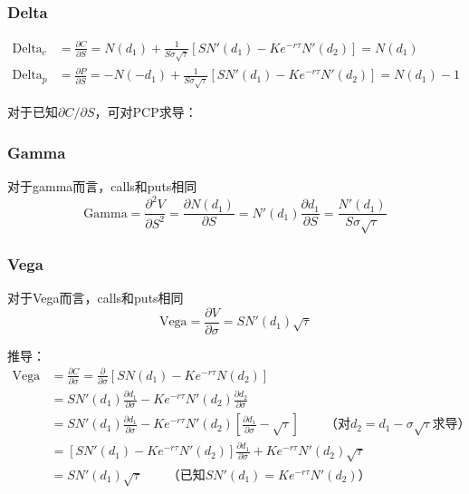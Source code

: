 \documentclass[11pt]{article}
\begin{document}
\subsubsection{Delta}

\noindent
\begin{align*}
    \text{Delta}_c &= \frac{\partial C}{\partial S}
    = N(d_1) + \frac{1}{S\sigma\sqrt{\tau}} \left[ SN'(d_1)-Ke^{-r\tau}N'(d_2) \right] = N(d_1) \\
    \text{Delta}_p &= \frac{\partial P}{\partial S}
    = -N(-d_1) + \frac{1}{S\sigma\sqrt{\tau}} \left[ SN'(d_1)-Ke^{-r\tau}N'(d_2) \right] = N(d_1)-1
\end{align*}

对于已知$\partial C/\partial S$，可对PCP求导：

\subsubsection{Gamma}

对于gamma而言，calls和puts相同
\begin{equation*}
    \text{Gamma} = \frac{\partial^2 V}{\partial S^2} = \frac{\partial N(d_1)}{\partial S} = N'(d_1)\frac{\partial d_1}{\partial S} = \frac{N'(d_1)}{S\sigma\sqrt{\tau}}
\end{equation*}

\subsubsection{Vega}

对于Vega而言，calls和puts相同
\begin{equation*}
    \text{Vega} = \frac{\partial V}{\partial \sigma}  = SN'(d_1)\sqrt{\tau}
\end{equation*}

推导：
\begin{align*}
    \text{Vega} &= \frac{\partial C}{\partial \sigma} = \frac{\partial}{\partial \sigma} \left[S N(d_1) - K e^{-r\tau}N(d_2)\right] \\
    &= S N'(d_1) \frac{\partial d_1}{\partial \sigma} - Ke^{-r\tau}N'(d_2) \frac{\partial d_2}{\partial \sigma} \\
    &= S N'(d_1) \frac{\partial d_1}{\partial \sigma} - Ke^{-r\tau}N'(d_2) \left[ \frac{\partial d_1}{\partial \sigma} -\sqrt{\tau} \right] \qquad \text{（对$d_2 = d_1 - \sigma\sqrt{\tau}$求导）} \\
    &= \left[ S N'(d_1) - Ke^{-r\tau}N'(d_2) \right] \frac{\partial d_1}{\partial \sigma} + Ke^{-r\tau}N'(d_2) \sqrt{\tau} \\
    &= S N'(d_1)\sqrt{\tau} \qquad \text{（已知$S N'(d_1) = Ke^{-r\tau}N'(d_2)$）}
\end{align*}
\end{document}
